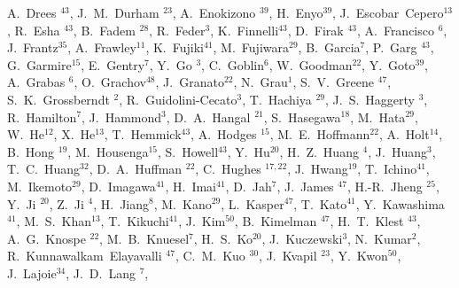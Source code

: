 \documentclass[type=preprint,linenumbering=off]{sphenix}
\begin{document}
\begin{flushleft}
A.~Drees\,\,$^{43}$,
J.~M.~Durham\,\,$^{23}$,
A.~Enokizono\,\,$^{39}$,
H.~Enyo$^{39}$,
J.~Escobar~Cepero$^{13}$,
R.~Esha\,\,$^{43}$,
B.~Fadem\,\,$^{28}$,
R.~Feder$^{3}$,
K.~Finnelli$^{43}$,
D.~Firak\,\,$^{43}$,
A.~Francisco\,\,$^{6}$,
J.~Frantz$^{35}$,
A.~Frawley$^{11}$,
K.~Fujiki$^{41}$,
M.~Fujiwara$^{29}$,
B.~Garcia$^{7}$,
P.~Garg\,\,$^{43}$,
G.~Garmire$^{15}$,
E.~Gentry$^{7}$,
Y.~Go\,\,$^{3}$,
C.~Goblin$^{6}$,
W.~Goodman$^{22}$,
Y.~Goto$^{39}$,
A.~Grabas\,\,$^{6}$,
O.~Grachov$^{48}$,
J.~Granato$^{22}$,
N.~Grau$^{1}$,
S.~V.~Greene\,\,$^{47}$,
S.~K.~Grossberndt\,\,$^{2}$,
R.~Guidolini-Cecato$^{3}$,
T.~Hachiya\,\,$^{29}$,
J.~S.~Haggerty\,\,$^{3}$,
R.~Hamilton$^{7}$,
J.~Hammond$^{3}$,
D.~A.~Hangal\,\,$^{21}$,
S.~Hasegawa$^{18}$,
M.~Hata$^{29}$,
W.~He$^{12}$,
X.~He$^{13}$,
T.~Hemmick$^{43}$,
A.~Hodges\,\,$^{15}$,
M.~E.~Hoffmann$^{22}$,
A.~Holt$^{14}$,
B.~Hong\,\,$^{19}$,
M.~Housenga$^{15}$,
S.~Howell$^{43}$,
Y.~Hu$^{20}$,
H.~Z.~Huang\,\,$^{4}$,
J.~Huang$^{3}$,
T.~C.~Huang$^{32}$,
D.~A.~Huffman\,\,$^{22}$,
C.~Hughes\,\,$^{17,22}$,
J.~Hwang$^{19}$,
T.~Ichino$^{41}$,
M.~Ikemoto$^{29}$,
D.~Imagawa$^{41}$,
H.~Imai$^{41}$,
D.~Jah$^{7}$,
J.~James\,\,$^{47}$,
H.-R.~Jheng\,\,$^{25}$,
Y.~Ji\,\,$^{20}$,
Z.~Ji\,\,$^{4}$,
H.~Jiang$^{8}$,
M.~Kano$^{29}$,
L.~Kasper$^{47}$,
T.~Kato$^{41}$,
Y.~Kawashima$^{41}$,
M.~S.~Khan$^{13}$,
T.~Kikuchi$^{41}$,
J.~Kim$^{50}$,
B.~Kimelman\,\,$^{47}$,
H.~T.~Klest\,\,$^{43}$,
A.~G.~Knospe\,\,$^{22}$,
M.~B.~Knuesel$^{7}$,
H.~S.~Ko$^{20}$,
J.~Kuczewski$^{3}$,
N.~Kumar$^{2}$,
R.~Kunnawalkam~Elayavalli\,\,$^{47}$,
C.~M.~Kuo\,\,$^{30}$,
J.~Kvapil\,\,$^{23}$,
Y.~Kwon$^{50}$,
J.~Lajoie$^{34}$,
J.~D.~Lang\,\,$^{7}$,

\end{flushleft}
\end{document}
